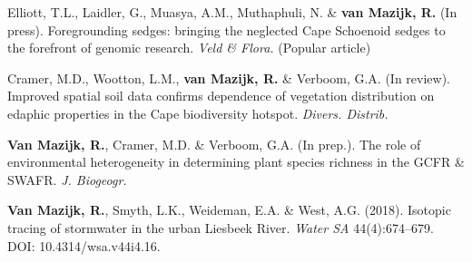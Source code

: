 \documentclass[10pt]{article}
\begin{document}
\begin{hangparas}{2em}{1}

Elliott, T.L., Laidler, G., Muasya, A.M., Muthaphuli, N. \& \textbf{van Mazijk, 
R.} (In press). Foregrounding sedges: bringing the neglected Cape Schoenoid 
sedges to the forefront of genomic research. \textit{Veld \& Flora.} (Popular 
article)

Cramer, M.D., Wootton, L.M., \textbf{van Mazijk, R.} \& Verboom, G.A. (In 
review). Improved spatial soil data confirms dependence of vegetation 
distribution on edaphic properties in the Cape biodiversity hotspot. \textit{
Divers. Distrib.}

\textbf{Van Mazijk, R.}, Cramer, M.D. \& Verboom, G.A. (In prep.). The role of
environmental heterogeneity in determining plant species richness in the GCFR \&
SWAFR. \textit{J. Biogeogr.}

\textbf{Van Mazijk, R.}, Smyth, L.K., Weideman, E.A. \& West, A.G. (2018).
Isotopic tracing of stormwater in the urban Liesbeek River. \textit{Water SA}
44(4):674--679. DOI: 10.4314/wsa.v44i4.16.


\hrulefill

\end{hangparas}
\end{document}
